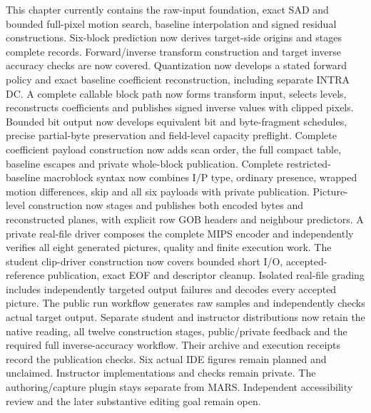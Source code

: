 This chapter currently contains the raw-input foundation, exact SAD and bounded
full-pixel motion search, baseline interpolation and signed residual constructions.
Six-block prediction now derives target-side origins and stages complete records.
Forward/inverse transform construction and target inverse accuracy checks are now
covered. Quantization now develops a stated forward policy and exact baseline
coefficient reconstruction, including separate INTRA DC. A complete callable block
path now forms transform input, selects levels, reconstructs coefficients and
publishes signed inverse values with clipped pixels. Bounded bit output now
develops equivalent bit and byte-fragment schedules, precise partial-byte
preservation and field-level capacity preflight. Complete coefficient payload
construction now adds scan order, the full compact table, baseline escapes and
private whole-block publication. Complete restricted-baseline macroblock syntax
now combines I/P type, ordinary presence, wrapped motion differences, skip and all
six payloads with private publication. Picture-level construction now stages and publishes both encoded bytes and reconstructed
planes, with explicit row GOB headers and neighbour predictors. A private real-file
driver composes the complete MIPS encoder and independently verifies all eight
generated pictures, quality and finite execution work. The student clip-driver construction now covers bounded short I/O, accepted-reference
publication, exact EOF and descriptor cleanup. Isolated real-file grading includes
independently targeted output failures and decodes every accepted picture. The public
run workflow generates raw samples and independently checks actual target output.
Separate student and instructor distributions now retain the native reading, all twelve
construction stages, public/private feedback and the required full inverse-accuracy
workflow. Their archive and execution receipts record the publication checks.
Six actual IDE figures remain planned and unclaimed. Instructor implementations and checks remain private.
The authoring/capture plugin stays separate from MARS. Independent accessibility
review and the later substantive editing goal remain open.
